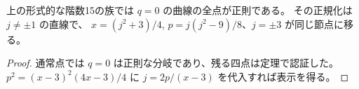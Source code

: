 \begin{corollary}
上の形式的な階数15の族では $q=0$ の曲線の全点が正則である。
その正規化は $j\ne\pm1$ の直線で、
$x=(j^2+3)/4$, $p=j(j^2-9)/8$、$j=\pm3$ が同じ節点に移る。
\end{corollary}
\begin{proof}
通常点では $q=0$ は正則な分岐であり、残る四点は定理で認証した。
$p^2=(x-3)^2(4x-3)/4$ に $j=2p/(x-3)$ を代入すれば表示を得る。
\end{proof}
